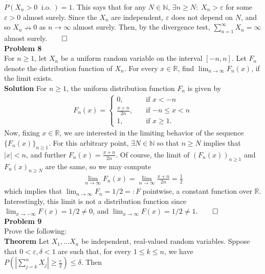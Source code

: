 \documentclass[10pt]{article}
\newcommand{\bp}[1]{\left({#1}\right)}
\newcommand{\mbb}[1]{\mathbb{#1}}
\newcommand{\1}[1]{\mathbbm{1}_{#1}}
\DeclareMathOperator{\io}{i.o.}
\begin{document}
    $P(X_n>0\;\io)=1$. This says that for any $N\in\mbb{N}$, $\exists n\geq N:\;X_n>\varepsilon$ for some $\varepsilon>0$ almost surely. Since the $X_n$ are independent, $\varepsilon$ does not depend on $N$, and so $X_n\nrightarrow 0$ as $n\rightarrow\infty$ almost surely. Then, by the divergence test, $\sum_{n=1}^\infty X_n=\infty$ almost surely.\hfill{$\qed$}\\[5pt]
    {\bf Problem 8}\\[5pt]
    For $n\geq 1$, let $X_n$ be a uniform random variable on the interval $[-n,n]$. Let $F_n$ denote the distribution function of $X_n$. For every $x\in\mbb{R}$, find $\lim_{n\rightarrow\infty}F_n(x)$, if the limit exists.\\[5pt]
    {\bf Solution}\hspace{5pt} For $n\geq 1$, the uniform distribution function $F_n$ is given by
    \begin{align*}
        F_n(x)=\begin{cases}
            0,\quad&\text{if $x<-n$}\\
            \frac{x+n}{2n},\quad&\text{if $-n\leq x<n$}\\
            1,\quad&\text{if $x\geq 1$}.
        \end{cases}
    \end{align*}
    Now, fixing $x\in\mbb{R}$, we are interested in the limiting behavior of the sequence $\{F_n(x)\}_{n\geq 1}$. For this arbitrary point, $\exists N\in\mbb{N}$ so that $n\geq N$ implies that $|x|< n$, and further $F_n(x)=\tfrac{x+n}{2n}$. Of course, the limit of $(F_n(x))_{n\geq 1}$ and $F_n(x)_{n\geq N}$ are the same, so we may compute
    \begin{align*}
        \lim_{n\rightarrow\infty} F_n(x)=\lim_{n\rightarrow\infty}\frac{x+n}{2n}=\frac{1}{2}
    \end{align*}
    which implies that $\lim_{n\rightarrow\infty}F_n=1/2=:F$ pointwise, a constant function over $\mbb{R}$. Interestingly, this limit is not a distribution function since $\lim_{x\rightarrow-\infty}F(x)=1/2\neq 0$, and $\lim_{x\rightarrow\infty}F(x)=1/2\neq 1$.\hfill{$\qed$}\\[5pt]
    {\bf Problem 9}\\[5pt]
    Prove the following:\\[5pt]
    {\bf Theorem}\hspace{5pt} Let $X_1,\dots X_n$ be independent, real-valued random variables. Sppose that $0<\varepsilon,\delta<1$ are such that, for every $1\leq k\leq n$, we have
    $P\bp{\left|\sum_{j=k}^nX_j\right|\geq \frac{\varepsilon}{2}}\leq \delta$. Then
\end{document}
